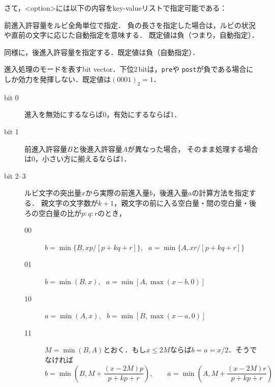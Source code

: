 \documentclass[a4paper,10pt]{ltjsarticle}
\begin{document}
さて，<option>には以下の内容をkey-valueリストで指定可能である：
\begin{description}
\def\makelabel#1{\tt#1}
\item[pre=<real>] 前進入許容量をルビ全角単位で指定．
負の長さを指定した場合は，ルビの状況や直前の文字に応じた自動指定を意味する．
既定値は負（つまり，自動指定）．

\item[post=<real>] 同様に，後進入許容量を指定する．既定値は負（自動指定）．

\item[mode] 進入処理のモードを表すbit vector．下位2\,bitは，\texttt{pre}や
\texttt{post}が負である場合にしか効力を発揮しない．既定値は$(0001)_2 = 1$．
\begin{description}
 \item[bit 0] 進入を無効にするならば0，有効にするならば1．
 \item[bit 1] 前進入許容量$B$と後進入許容量$A$が異なった場合，
そのまま処理する場合は0，小さい方に揃えるならば1．
 \item[bit 2--3] ルビ文字の突出量$x$から実際の前進入量$b$，後進入量$a$の計算方法を指定する．
親文字の文字数が$k+1$，親文字の前に入る空白量・間の空白量・後ろの空白量の比が$p:q:r$のとき，
\begin{description}
 \item[00] $b=\min\{B, xp/[p+kq+r]\}$, \ $a=\min\{A, xr/[p+kq+r]\}$
 \item[01] $b=\min(B, x)$, \ $a=\min[A, \max(x-b,0)]$
 \item[10] $a=\min(A, x)$, \ $b=\min[B, \max(x-a,0)]$
 \item[11] $M=\min(B,A)$とおく．もし$x\le 2M$ならば$b=a=x/2$．そうでなければ
\[
 b=\min\left(B, M + \frac{(x-2M)p}{p+kp+r}\right),\qquad 
 a=\min\left(A, M + \frac{(x-2M)r}{p+kp+r}\right)
\]
\end{description}


\end{description}
\end{description}
\end{document}
